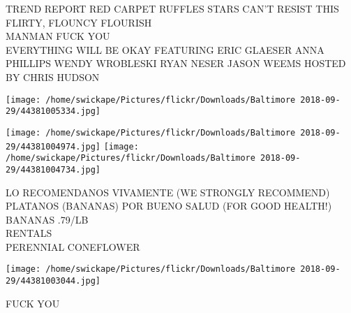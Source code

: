 \documentclass[10pt,letterpaper]{article}
\begin{document}
TREND REPORT RED CARPET RUFFLES STARS CAN'T RESIST THIS FLIRTY, FLOUNCY FLOURISH\\
MANMAN FUCK YOU\\
EVERYTHING WILL BE OKAY FEATURING ERIC GLAESER ANNA PHILLIPS WENDY WROBLESKI RYAN NESER JASON WEEMS HOSTED BY CHRIS HUDSON
\pagebreak

\texttt{[image: /home/swickape/Pictures/flickr/Downloads/Baltimore 2018-09-29/44381005334.jpg]}

\vspace{0.25in}
\texttt{[image: /home/swickape/Pictures/flickr/Downloads/Baltimore 2018-09-29/44381004974.jpg]}
\texttt{[image: /home/swickape/Pictures/flickr/Downloads/Baltimore 2018-09-29/44381004734.jpg]}

LO RECOMENDANOS VIVAMENTE (WE STRONGLY RECOMMEND) PLATANOS (BANANAS) POR BUENO SALUD (FOR GOOD HEALTH!) BANANAS .79/LB\\
RENTALS\\
PERENNIAL CONEFLOWER
\pagebreak

\texttt{[image: /home/swickape/Pictures/flickr/Downloads/Baltimore 2018-09-29/44381003044.jpg]}

FUCK YOU
\pagebreak
\end{document}
